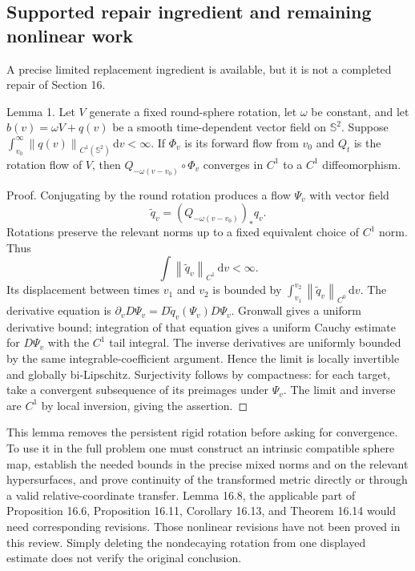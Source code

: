 \documentclass[10pt]{article}
\begin{document}
\subsection*{Supported repair ingredient and remaining nonlinear work}
A precise limited replacement ingredient is available, but it is not a completed repair of Section 16.\par
Lemma 1.  Let \(V\) generate a fixed round-sphere rotation, let \(\omega\) be constant, and let \(b(v)=\omega V+q(v)\) be a smooth time-dependent vector field on \(\mathbb S^2\). Suppose \(\int_{v_0}^\infty \left\lVert q(v)\right\rVert_{C^1(\mathbb S^2)}\,\mathrm dv<\infty\). If \(\Phi_v\) is its forward flow from \(v_0\) and \(Q_t\) is the rotation flow of \(V\), then \(Q_{-\omega(v-v_0)}\circ\Phi_v\) converges in \(C^1\) to a \(C^1\) diffeomorphism.\par
Proof. Conjugating by the round rotation produces a flow \(\Psi_v\) with vector field \[\widetilde q_v=(Q_{-\omega(v-v_0)})_*q_v.\] Rotations preserve the relevant norms up to a fixed equivalent choice of \(C^1\) norm. Thus \[\int\left\lVert\widetilde q_v\right\rVert_{C^1}\,\mathrm dv<\infty.\] Its displacement between times \(v_1\) and \(v_2\) is bounded by \(\int_{v_1}^{v_2}\left\lVert\widetilde q_v\right\rVert_{C^0}\,\mathrm dv\). The derivative equation is \(\partial_vD\Psi_v=D\widetilde q_v(\Psi_v)D\Psi_v\). Gronwall gives a uniform derivative bound; integration of that equation gives a uniform Cauchy estimate for \(D\Psi_v\) with the \(C^1\) tail integral. The inverse derivatives are uniformly bounded by the same integrable-coefficient argument. Hence the limit is locally invertible and globally bi-Lipschitz. Surjectivity follows by compactness: for each target, take a convergent subsequence of its preimages under \(\Psi_v\). The limit and inverse are \(C^1\) by local inversion, giving the assertion. ◻\par
This lemma removes the persistent rigid rotation before asking for convergence. To use it in the full problem one must construct an intrinsic compatible sphere map, establish the needed bounds in the precise mixed norms and on the relevant hypersurfaces, and prove continuity of the transformed metric directly or through a valid relative-coordinate transfer. Lemma 16.8, the applicable part of Proposition 16.6, Proposition 16.11, Corollary 16.13, and Theorem 16.14 would need corresponding revisions. Those nonlinear revisions have not been proved in this review. Simply deleting the nondecaying rotation from one displayed estimate does not verify the original conclusion.\par
\end{document}
